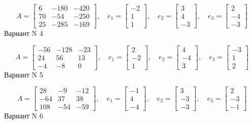 \documentclass[11pt]{report}
\begin{document}
$$A = \left[\begin{matrix}6 & -180 & -420\\70 & -54 & -250\\25 & -285 & -169\end{matrix}\right],\quad e_1 = \left[\begin{matrix}-2\\1\\1\end{matrix}\right],\quad e_2 = \left[\begin{matrix}3\\4\\-3\end{matrix}\right],\quad e_3 = \left[\begin{matrix}2\\-4\\-3\end{matrix}\right]$$Вариант N 4

$$A = \left[\begin{matrix}-56 & -128 & -23\\24 & 56 & 13\\-4 & -8 & 0\end{matrix}\right],\quad e_1 = \left[\begin{matrix}2\\-2\\1\end{matrix}\right],\quad e_2 = \left[\begin{matrix}4\\-4\\3\end{matrix}\right],\quad e_3 = \left[\begin{matrix}-3\\1\\2\end{matrix}\right]$$Вариант N 5

$$A = \left[\begin{matrix}28 & -9 & -12\\-64 & 37 & 38\\108 & -54 & -59\end{matrix}\right],\quad e_1 = \left[\begin{matrix}-1\\4\\-4\end{matrix}\right],\quad e_2 = \left[\begin{matrix}3\\-3\\-3\end{matrix}\right],\quad e_3 = \left[\begin{matrix}2\\-3\\-1\end{matrix}\right]$$Вариант N 6
\end{document}
